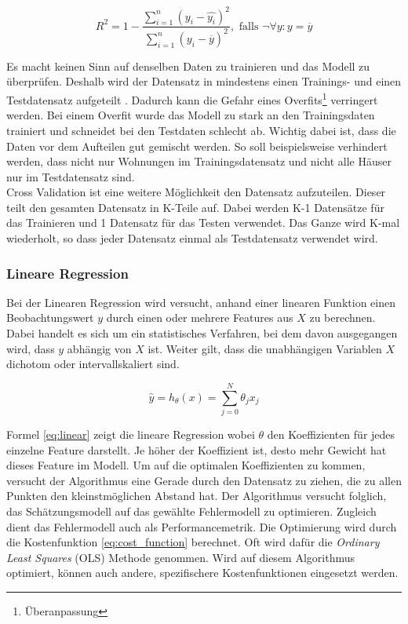\begin{equation}\label{eq:r2}
R^2 = 1 - \frac{\sum_{i=1}^{n} (y_i - \hat{y_i})^2}{\sum_{i=1}^{n}(y_i - \overline{y})^2},\text{ falls } \neg \forall y:y = \overline{y}
\end{equation}

Es macht keinen Sinn auf denselben Daten zu trainieren und das Modell zu überprüfen. Deshalb wird der Datensatz in mindestens einen Trainings- und einen Testdatensatz aufgeteilt \cite{cross_validation}.
Dadurch kann die Gefahr eines Overfits\footnote{Überanpassung} verringert werden. Bei einem Overfit wurde das Modell zu stark an den Trainingsdaten trainiert und schneidet bei den Testdaten schlecht ab. Wichtig dabei ist, dass die Daten vor dem Aufteilen gut gemischt werden. So soll beispielsweise verhindert werden, dass nicht nur Wohnungen im Trainings\-datensatz und nicht alle Häuser nur im Testdatensatz sind.\\
Cross Validation ist eine weitere Möglichkeit den Datensatz aufzuteilen. Dieser teilt den gesamten Datensatz in K-Teile auf. Dabei werden K-1 Datensätze für das Trainieren und 1 Datensatz für das Testen verwendet. Das Ganze wird K-mal wiederholt, so dass jeder Datensatz einmal als Testdatensatz verwendet wird.
%
\subsubsection{Lineare Regression}
Bei der Linearen Regression wird versucht, anhand einer linearen Funktion einen Beobachtungswert $y$ durch einen oder mehrere Features aus $X$ zu berechnen. Dabei handelt es sich um ein statistisches Verfahren, bei dem davon ausgegangen wird, dass $y$ abhängig von $X$ ist. Weiter gilt, dass die unabhängigen Variablen $X$ dichotom oder intervallskaliert sind.

\begin{equation}\label{eq:linear}
\hat{y} = h_\theta(x) = \sum_{j=0}^{N} \theta_j x_j
\end{equation}

Formel \eqref{eq:linear} zeigt die lineare Regression wobei $\theta$ den Koeffizienten für jedes einzelne Feature darstellt. Je höher der Koeffizient ist, desto mehr Gewicht hat dieses Feature im Modell. Um auf die optimalen Koeffizienten zu kommen, versucht der Algorithmus eine Gerade durch den Datensatz zu ziehen, die zu allen Punkten den kleinstmöglichen Abstand hat. Der Algorithmus versucht folglich, das Schätzungsmodell auf das gewählte Fehlermodell zu optimieren. Zugleich dient das Fehlermodell auch als Performancemetrik. Die Optimierung wird durch die Kostenfunktion \eqref{eq:cost_function} berechnet. Oft wird dafür die \textit{Ordinary Least Squares} (OLS) Methode genommen. Wird auf diesem Algorithmus optimiert, können auch andere, spezifischere Kostenfunktionen eingesetzt werden.

